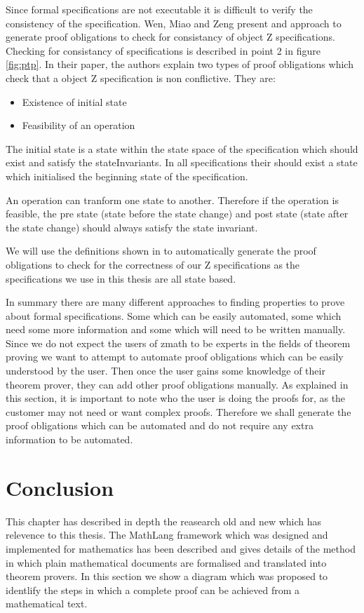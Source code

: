Since formal specifications are not executable it is difficult to verify the consistency of the specification. Wen, Miao and Zeng \cite{DBLP:conf/icsea/WenMZ06} present and approach to generate proof obligations to check for consistancy of object Z specifications. Checking for consistancy of specifications is described in point 2 in figure \ref{fig:ptp}. In their paper, the authors explain two 
types of proof obligations which check that a object Z specification is non conflictive. They are:

\begin{itemize}
\item Existence of initial state

\item Feasibility of an operation
\end{itemize}

The initial state is a state within the state space of the specification which should exist and satisfy the stateInvariants. In all specifications their should exist a state which initialised the beginning state of the specification.

An operation can tranform one state to another. Therefore if the operation is feasible, the pre state (state before the state change) and post state (state after the state change) should always satisfy the state invariant. 

We will use the definitions shown in \cite{DBLP:conf/icsea/WenMZ06} to automatically generate the proof obligations to check for the correctness of our Z specifications as the specifications we use in this thesis are all state based.

In summary there are many different approaches to finding properties to prove about formal specifications. Some which can be easily automated, some which need some more information and some which will need to be written manually. Since we do not expect the users of \gls{zmath} to be experts in the fields of theorem proving we want to attempt to automate proof obligations which can be easily understood by the user. Then once the user gains some knowledge of their theorem prover, they can add other proof obligations manually. As explained in this section, it is important to note who the user is doing the proofs for, as the customer may not need or want complex proofs. Therefore we shall generate the proof obligations which can be automated and do not require any extra information to be automated.

\section{Conclusion}
This chapter has described in depth the reasearch old and new which has relevence to this thesis. The MathLang framework which was designed and implemented for mathematics has been described and gives details of the method in which plain mathematical documents are formalised and translated into theorem provers. In this section we show a diagram which was proposed to identlify the steps in which a complete proof can be achieved from a mathematical text. 

